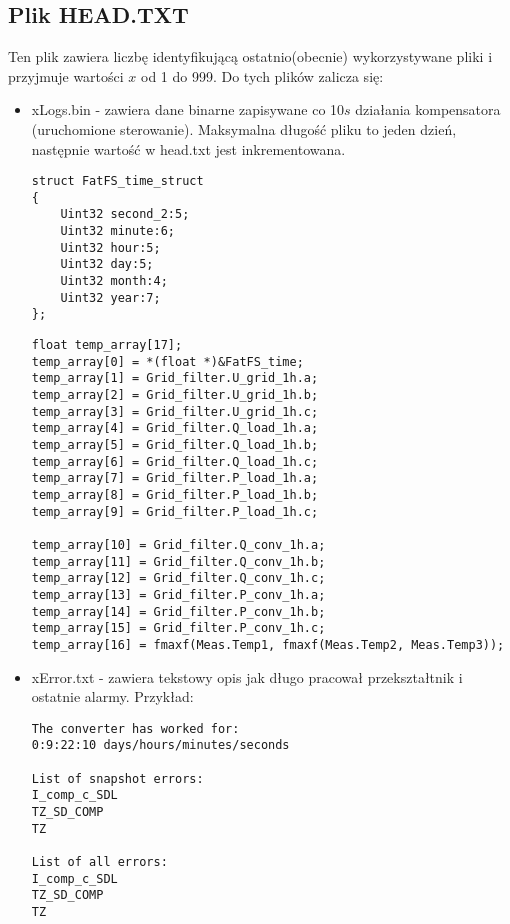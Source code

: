 \documentclass[12pt,a4paper]{article}
\begin{document}
\clearpage

\subsection{Plik HEAD.TXT}
Ten plik zawiera liczbę identyfikującą ostatnio(obecnie) wykorzystywane pliki i przyjmuje wartości $x$ od 1 do 999. Do tych plików zalicza się:
\begin{itemize}
	\item xLogs.bin - zawiera dane binarne zapisywane co 10$s$ działania kompensatora (uruchomione sterowanie). Maksymalna długość pliku to jeden dzień, następnie wartość w head.txt jest inkrementowana. 

	\begin{lstlisting}[float=!h, style=customc, belowskip=-10pt]
struct FatFS_time_struct
{
	Uint32 second_2:5;
	Uint32 minute:6;
	Uint32 hour:5;
	Uint32 day:5;
	Uint32 month:4;
	Uint32 year:7;
};
\end{lstlisting}


	\begin{lstlisting}[float=!h, style=customc, belowskip=-10pt]
float temp_array[17];
temp_array[0] = *(float *)&FatFS_time;
temp_array[1] = Grid_filter.U_grid_1h.a;
temp_array[2] = Grid_filter.U_grid_1h.b;
temp_array[3] = Grid_filter.U_grid_1h.c;
temp_array[4] = Grid_filter.Q_load_1h.a;
temp_array[5] = Grid_filter.Q_load_1h.b;
temp_array[6] = Grid_filter.Q_load_1h.c;
temp_array[7] = Grid_filter.P_load_1h.a;
temp_array[8] = Grid_filter.P_load_1h.b;
temp_array[9] = Grid_filter.P_load_1h.c;

temp_array[10] = Grid_filter.Q_conv_1h.a;
temp_array[11] = Grid_filter.Q_conv_1h.b;
temp_array[12] = Grid_filter.Q_conv_1h.c;
temp_array[13] = Grid_filter.P_conv_1h.a;
temp_array[14] = Grid_filter.P_conv_1h.b;
temp_array[15] = Grid_filter.P_conv_1h.c;
temp_array[16] = fmaxf(Meas.Temp1, fmaxf(Meas.Temp2, Meas.Temp3));
\end{lstlisting}
	
	\item xError.txt - zawiera tekstowy opis jak długo pracował przekształtnik i ostatnie alarmy. Przykład:
	\begin{lstlisting}[]
The converter has worked for:
0:9:22:10 days/hours/minutes/seconds

List of snapshot errors:
I_comp_c_SDL
TZ_SD_COMP    
TZ            

List of all errors:
I_comp_c_SDL
TZ_SD_COMP    
TZ      
	\end{lstlisting}
	

\end{itemize}
\end{document}
